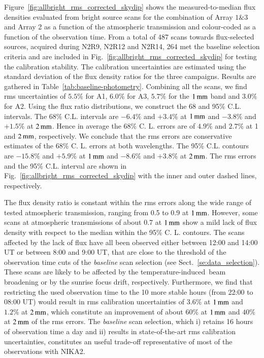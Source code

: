\documentclass[traditionalabstract]{aa}
\newcommand{\afternoon}{temperature-induced}
\newcommand{\lp}[1]{#1}
\begin{document}
Figure~\ref{fig:allbright_rms_corrected_skydip} shows the
measured-to-median flux densities evaluated from bright source scans
for the combination of Array $1\&3$ and Array 2 as a function of the
atmospheric transmission and colour-coded as a function of the
observation time. From a total of 487 scans towards
flux-selected sources, acquired during N2R9, N2R12 and N2R14, 264 met
the baseline selection criteria and are included in
Fig.~\ref{fig:allbright_rms_corrected_skydip} for testing the
calibration stability. The calibration uncertainties are
estimated using the standard deviation of the flux density ratios for
the three campaigns. Results are gathered in
Table~\ref{tab:baseline-photometry}.
Combining all the scans, we find rms uncertainties of $5.5\%$ for A1,
$6.0\%$ for A3, $5.7\%$ for the $1\,\rm{mm}$ band and $3.0\%$ for A2.
{\lp Using the flux ratio distributions, we construct the 68 and 95\%
C.L. intervals. The 68\% C.L. intervals are $-6.4\%$ and $+3.4\%$ at
$1\,\rm{mm}$ and $-3.8\%$ and $+1.5\%$ at $2\, \rm{mm}$. Hence in average
the 68\% C. L. errors are of $4.9\%$ and $2.7\%$ at 1 and $2\, \rm{mm}$,
respectively. We conclude that the rms errors are conservative
estimates of the 68\% C. L. errors at both wavelengths. The 95\%
C.L. contours are $-15.8\%$ and $+5.9\%$ at $1\,\rm{mm}$ and $-8.6\%$ and
$+3.8\%$ at $2\, \rm{mm}$.
The rms errors and the 95\%
C.L. interval are shown in
Fig.~\ref{fig:allbright_rms_corrected_skydip} with the inner and
outer dashed lines, respectively.} 

The flux density ratio is constant within the rms errors along the
wide range of tested atmospheric transmission, ranging from 0.5 to 0.9
at $1\,\rm{mm}$.
However, some scans at atmospheric transmissions of about 0.7 at
$1\,\rm{mm}$ show a mild lack of flux density with respect to the
median within the 95\% C. L. contours. The scans
affected by the lack of flux have all been observed
either between 12:00 and 14:00 UT or between 8:00 and 9:00 UT,
that are close to the threshold of the observation time cuts of
the \emph{baseline} scan selection (see
Sect.~\ref{se:data_selection}). These scans are likely
to be affected by the \afternoon\ beam broadening or by the
sunrise focus drift, respectively. Furthermore, we find that restricting the
used observation time to the 10 more stable hours (from 22:00 to
08:00 UT) would result in rms calibration uncertainties of
$3.6\%$ at $1\,\rm{mm}$ and $1.2\%$ at $2\,\rm{mm}$, which constitute an
improvement of about $60\%$ at $1\,\rm{mm}$ and $40\%$ at $2\,\rm{mm}$
of the rms errors.  
The \emph{baseline} scan selection, which i)
retains 16 hours of observation time
a day and ii) 
{\lp results in state-of-the-art rms calibration
uncertainties,} constitutes {\lp an useful trade-off representative of most
of the observations with NIKA2.} 
\end{document}
